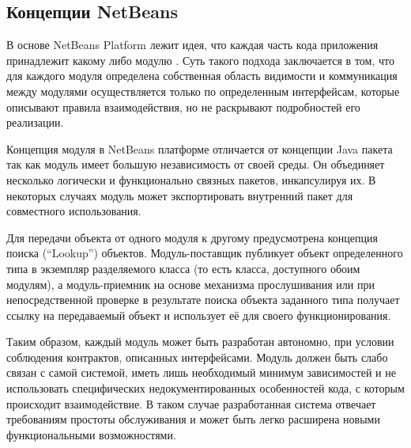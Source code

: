 \documentclass[14pt,oneside,final]{extreport}
\begin{document}
	\subsection{Концепции NetBeans}	
	В основе NetBeans Platform лежит идея, что каждая часть кода приложения принадлежит какому либо модулю \cite{book:NetBeans}. Суть такого подхода заключается в том, что для каждого модуля определена собственная область видимости и коммуникация между модулями осуществляется только по определенным интерфейсам, которые описывают правила взаимодействия, но не раскрывают подробностей его реализации. 
	
	Концепция модуля в NetBeans платформе отличается от концепции Java пакета так как модуль имеет большую независимость от своей среды. Он объединяет несколько логически и функционально связных пакетов, инкапсулируя их. В некоторых случаях модуль может экспортировать внутренний пакет для совместного использования. 
	
	Для передачи объекта от одного модуля к другому предусмотрена концепция поиска (``Lookup'') объектов. Модуль-поставщик публикует объект определенного типа в экземпляр разделяемого класса (то есть класса, доступного обоим модулям), а модуль-приемник на основе механизма прослушивания или при непосредственной проверке в результате поиска объекта заданного типа получает ссылку на передаваемый объект и использует её для своего функционирования.
	
	Таким образом, каждый модуль может быть разработан автономно, при условии соблюдения контрактов, описанных интерфейсами. Модуль должен быть слабо связан с самой системой, иметь лишь необходимый минимум зависимостей и не использовать специфических недокументированных особенностей кода, с которым происходит взаимодействие. В таком случае разработанная система отвечает требованиям простоты обслуживания и может быть легко расширена новыми функциональными возможностями.
\end{document}
